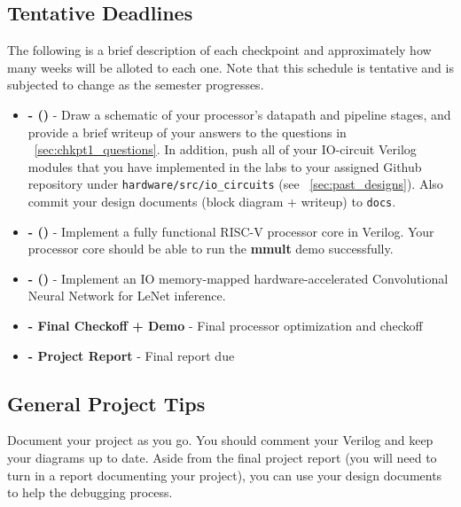 \documentclass[11pt]{article}
\begin{document}
\subsection{Tentative Deadlines}
\label{tentative_deadlines}
The following is a brief description of each checkpoint and approximately how many weeks will be alloted to each one. Note that this schedule is tentative and is subjected to change as the semester progresses.


\begin{itemize}
  \item \textbf{\blockDiagramDueDate \space - \blockDiagramTaskName \space (\blockDiagramTimeAlloted)} - Draw a schematic of your processor's datapath and pipeline stages, and provide a brief writeup of your answers to the questions in ~\ref{sec:chkpt1_questions}. In addition, push all of your IO-circuit Verilog modules that you have implemented in the labs to your assigned Github repository under \verb|hardware/src/io_circuits| (see ~\ref{sec:past_designs}). Also commit your design documents (block diagram + writeup) to \verb|docs|.
  \item \textbf{\baseCPUDueDate \space - \baseCPUTaskName \space (\baseCPUTimeAlloted)} - Implement a fully functional RISC-V processor core in Verilog. Your processor core should be able to run the \textbf{mmult} demo successfully.
  \item \textbf{\imageDueDate \space - \imageTaskName \space (\imageTimeAlloted)} - Implement an IO memory-mapped hardware-accelerated Convolutional Neural Network for LeNet inference.
  \item \textbf{\finalCheckoffDueDate \space - Final Checkoff + Demo} - Final processor optimization and checkoff
  \item \textbf{\finalReportDueDate \space - Project Report} - Final report due
\end{itemize}

\subsection{General Project Tips}
\label{tips}
Document your project as you go.
You should comment your Verilog and keep your diagrams up to date.
Aside from the final project report (you will need to turn in a report documenting your project), you can use your design documents to help the debugging process.
\end{document}
